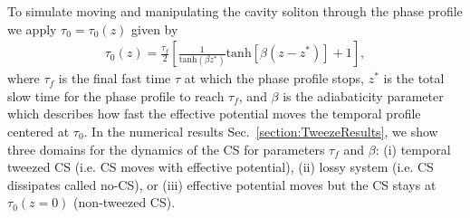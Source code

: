 To simulate moving and manipulating the cavity soliton through the phase profile we apply $\tau_0 = \tau_0(z)$ given by 
\begin{align}
\tau_0 (z) = \frac{\tau_f}{2} \left [ \frac{1}{\mathrm{tanh} (\beta z^*)} \mathrm{tanh} [\beta (z - z^*)] + 1\right],
\label{tau0}
\end{align} 
where $\tau_f$ is the final fast time $\tau$ at which the phase profile stops, $z^*$ is the total slow time for the phase profile to reach $\tau_f$, and $\beta$ is the adiabaticity parameter which describes how fast the effective potential moves the temporal profile centered at $\tau_0$.  In the numerical results Sec.~\ref{section:TweezeResults}, we show three domains for the dynamics of the CS for parameters $\tau_f$ and $\beta$: (i) temporal tweezed CS (i.e. CS moves with effective potential), (ii) lossy system (i.e. CS dissipates called no-CS), or (iii) effective potential moves but the CS stays at $\tau_0(z=0)$ (non-tweezed CS). 


